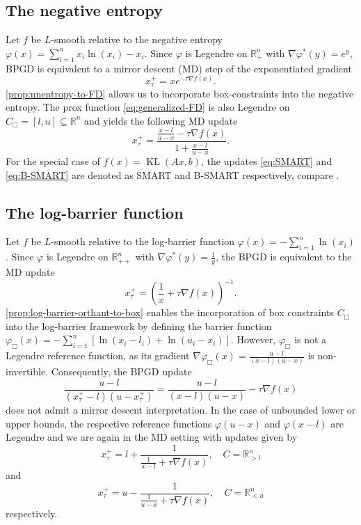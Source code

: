 \documentclass[11pt,reqno]{amsart}
\numberwithin{equation}{section}
\numberwithin{figure}{section}
\theoremstyle{plain}
\theoremstyle{definition}
\newcommand{\R}{\mathbb{R}}
\newcommand{\vphi}{\varphi}
\newcommand{\df}{\nabla f}
\DeclareMathOperator{\KL}{KL}
\begin{document}
\subsection{The negative entropy} \label{sec:solving_BPGD_iterates_neg_entropy}
Let $f$ be $L$-smooth relative to the negative entropy $\vphi(x) =  \sum_{i = 1}^n x_i \ln(x_i) - x_i$. Since $\vphi$ is Legendre on $\R^n_{+}$ with $\nabla \vphi^\ast(y) = e^y$, BPGD is equivalent to a mirror descent (MD) step of the exponentiated gradient
\begin{equation} \label{eq:SMART}
    x^+_\tau = xe^{- \tau \df(x)}.
\end{equation}
\cref{prop:nnentropy-to-FD} allows us to incorporate box-constraints into the negative entropy. The prox function \eqref{eq:generalized-FD} is also Legendre on $C_\Box = [l,u] \subseteq \R^n$ and yields the following MD update
\begin{equation} \label{eq:B-SMART}
        x_\tau^+ = \frac{\frac{x-l}{u-x}-\tau \df(x)}{1 + \frac{x-l}{u-x}}.
\end{equation}
For the special case of $f(x) = \KL(Ax,b)$, the updates \eqref{eq:SMART} and \eqref{eq:B-SMART} are denoted as SMART and B-SMART respectively, compare \cite{Andersen:1984,Petra2013a}.
\subsection{The log-barrier function} \label{sec:solving_BPGD_iterates_log_barrier}
Let $f$ be $L$-smooth relative to the log-barrier function $\vphi(x) = - \sum_{i = 1}^n \ln(x_i)$. Since $\vphi$ is Legendre on $\R^n_{++}$ with $\nabla \vphi^\ast(y) = \frac{1}{y}$, the BPGD is equivalent to the MD update
\begin{equation}
    x_\tau^+ = \left(\frac{1}{x} + \tau \df(x)\right)^{-1}.
\end{equation}
\cref{prop:log-barrier-orthant-to-box} 
enables the incorporation of box constraints  $C_\Box$
into the log-barrier framework by defining the barrier function
$\vphi_\Box(x) = - \sum_{i = 1}^n \left[ \ln(x_i - l_i) + \ln(u_i - x_i)\right]$. However, $\vphi_\Box$ is not a Legendre reference function, as its gradient $\nabla \vphi_\Box(x) = \frac{u-l}{(x-l)(u-x)}$ is non-invertible. Consequently,  the BPGD update
\begin{equation}
    \frac{u-l}{(x^+_\tau-l)(u-x^+_\tau)} = \frac{u-l}{(x-l)(u-x)} - \tau \nabla f(x)
\end{equation}
does not admit a mirror descent interpretation.
In the case of unbounded lower or upper bounds, the respective reference functions $\vphi(u-x)$ and $\vphi(x-l)$ are Legendre and we are again in the MD setting with updates given by
\begin{equation}
    x_\tau^+ = l + \frac{1}{\frac{1}{x-l} + \tau \df(x)}, \quad C = \R^n_{>l}
\end{equation}
and
\begin{equation}
    x_\tau^+ = u - \frac{1}{\frac{1}{u-x} + \tau \df(x)}, \quad C = \R^n_{<u}
\end{equation}
respectively.
\end{document}

